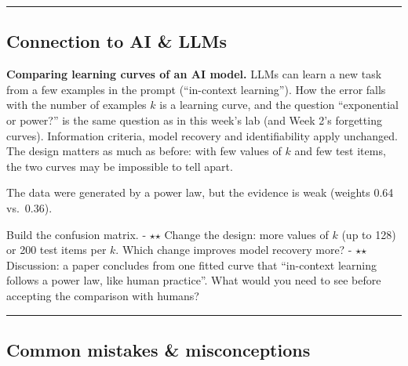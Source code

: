 \begin{center}\rule{0.5\linewidth}{0.5pt}\end{center}

\subsection{Connection to AI \& LLMs}

\textbf{Comparing learning curves of an AI model.} LLMs can learn a new
task from a few examples in the prompt (``in-context learning''). How
the error falls with the number of examples \(k\) is a learning curve,
and the question ``exponential or power?'' is the same question as in
this week's lab (and Week 2's forgetting curves). Information criteria,
model recovery and identifiability apply unchanged. The design matters
as much as before: with few values of \(k\) and few test items, the two
curves may be impossible to tell apart.

The data were generated by a power law, but the evidence is weak
(weights 0.64 vs.~0.36).

Build the confusion matrix. - \ensuremath{\star}\ensuremath{\star} Change the design: more values of \(k\)
(up to 128) or 200 test items per \(k\). Which change improves model
recovery more? - \ensuremath{\star}\ensuremath{\star} Discussion: a paper concludes from one fitted curve
that ``in-context learning follows a power law, like human practice''.
What would you need to see before accepting the comparison with humans?

\begin{center}\rule{0.5\linewidth}{0.5pt}\end{center}

\subsection{Common mistakes \& misconceptions}

